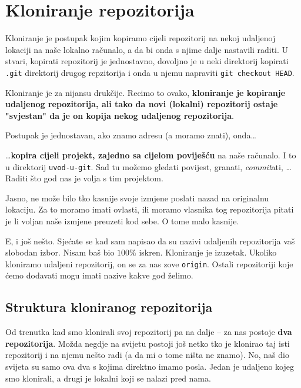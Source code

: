 \section*{Kloniranje repozitorija}

Kloniranje je postupak kojim kopiramo cijeli repozitorij na nekoj udaljenoj lokaciji na naše lokalno računalo, a da bi onda s njime dalje nastavili raditi.
U stvari, kopirati repozitorij je jednostavno, dovoljno je u neki direktorij kopirati \verb+.git+ direktorij drugog repzitorija i onda u njemu napraviti \verb+git checkout HEAD+.

Kloniranje je za nijansu drukčije.
Recimo to ovako, \textbf{kloniranje je kopiranje udaljenog repozitorija, ali tako da novi (lokalni) repozitorij ostaje "svjestan" da je on kopija nekog udaljenog repozitorija}.

Postupak je jednostavan, ako znamo adresu (a moramo znati), onda\dots



\dots{}\textbf{kopira cijeli projekt, zajedno sa cijelom poviješću} na naše računalo.
I to u direktorij \verb+uvod-u-git+.
Sad tu možemo gledati povijest, granati, \emph{commit}ati, \dots Raditi što god nas je volja s tim projektom.

Jasno, ne može bilo tko kasnije svoje izmjene poslati nazad na originalnu lokaciju. 
Za to moramo imati ovlasti, ili moramo vlasnika tog repozitorija pitati je li voljan naše izmjene preuzeti kod sebe.
O tome malo kasnije.

E, i još nešto. Sjećate se kad sam napisao da su nazivi udaljenih repozitorija vaš slobodan izbor.
Nisam baš bio $100\%$ iskren. 
Kloniranje je izuzetak.
Ukoliko kloniramo udaljeni repozitorij, on se za nas zove \verb+origin+.
Ostali repozitoriji koje ćemo dodavati mogu imati nazive kakve god želimo.

\subsection*{Struktura kloniranog repozitorija}

Od trenutka kad smo klonirali svoj repozitorij pa na dalje -- za nas postoje \textbf{dva repozitorija}.
Možda negdje na svijetu postoji još netko tko je klonirao taj isti repozitorij i na njemu nešto radi (a da mi o tome ništa ne znamo).
No, naš dio svijeta su samo ova dva s kojima direktno imamo posla. 
Jedan je udaljeno kojeg smo klonirali, a drugi je lokalni koji se nalazi pred nama.

